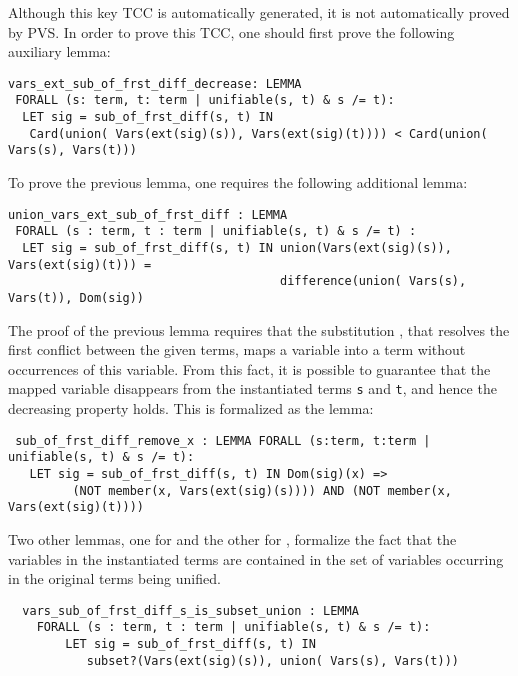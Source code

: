 \documentclass[submission,copyright,creativecommons]{eptcs}
\begin{document}
  Although this key TCC is automatically generated, it is not
  automatically proved by PVS. In order to prove this TCC, one should
  first prove the following auxiliary lemma:

  {\small
\begin{verbatim}
vars_ext_sub_of_frst_diff_decrease: LEMMA
 FORALL (s: term, t: term | unifiable(s, t) & s /= t):
  LET sig = sub_of_frst_diff(s, t) IN
   Card(union( Vars(ext(sig)(s)), Vars(ext(sig)(t)))) < Card(union( Vars(s), Vars(t)))
\end{verbatim}
  }

  To prove the previous lemma, one requires the following additional
  lemma:

  {\small
\begin{verbatim}
union_vars_ext_sub_of_frst_diff : LEMMA
 FORALL (s : term, t : term | unifiable(s, t) & s /= t) :
  LET sig = sub_of_frst_diff(s, t) IN union(Vars(ext(sig)(s)), Vars(ext(sig)(t))) = 
                                      difference(union( Vars(s), Vars(t)), Dom(sig))
\end{verbatim}
  }

  The proof of the previous lemma requires that the substitution
  , that resolves the first conflict between the given terms,
  maps a variable into a term without occurrences of this variable.
  From this fact, it is possible to guarantee that the mapped variable
  disappears from the instantiated terms {\tt s} and
  {\tt t}, and hence the decreasing property holds. This
  is formalized as the lemma:

  {\small
\begin{verbatim}
 sub_of_frst_diff_remove_x : LEMMA FORALL (s:term, t:term | unifiable(s, t) & s /= t):
   LET sig = sub_of_frst_diff(s, t) IN Dom(sig)(x) =>  
         (NOT member(x, Vars(ext(sig)(s)))) AND (NOT member(x, Vars(ext(sig)(t))))
\end{verbatim}
  }

  Two other lemmas, one for  and the other for , formalize the
  fact that the variables in the  instantiated terms are
  contained in the set of variables occurring in the original terms
  being unified.

  {\small
\begin{verbatim}
  vars_sub_of_frst_diff_s_is_subset_union : LEMMA
    FORALL (s : term, t : term | unifiable(s, t) & s /= t):
        LET sig = sub_of_frst_diff(s, t) IN
           subset?(Vars(ext(sig)(s)), union( Vars(s), Vars(t)))
\end{verbatim}
  }
\end{document}
